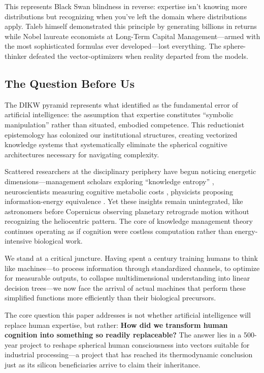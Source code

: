 This represents \citet{taleb2007} Black Swan blindness in reverse: expertise isn't knowing more distributions but recognizing when you've left the domain where distributions apply. Taleb himself demonstrated this principle by generating billions in returns while Nobel laureate economists at Long-Term Capital Management---armed with the most sophisticated formulas ever developed---lost everything. The sphere-thinker defeated the vector-optimizers when reality departed from the models.

\subsection{The Question Before Us}

The DIKW pyramid represents what \citet{dreyfus1979} identified as the fundamental error of artificial intelligence: the assumption that expertise constitutes ``symbolic manipulation'' rather than situated, embodied competence. This reductionist epistemology has colonized our institutional structures, creating vectorized knowledge systems that systematically eliminate the spherical cognitive architectures necessary for navigating complexity.

Scattered researchers at the disciplinary periphery have begun noticing energetic dimensions---management scholars exploring ``knowledge entropy'' \citep{bratianu2020}, neuroscientists measuring cognitive metabolic costs \citep{wiehler2022}, physicists proposing information-energy equivalence \citep{stonier1996}. Yet these insights remain unintegrated, like astronomers before Copernicus observing planetary retrograde motion without recognizing the heliocentric pattern. The core of knowledge management theory continues operating as if cognition were costless computation rather than energy-intensive biological work.

We stand at a critical juncture. Having spent a century training humans to think like machines---to process information through standardized channels, to optimize for measurable outputs, to collapse multidimensional understanding into linear decision trees---we now face the arrival of actual machines that perform these simplified functions more efficiently than their biological precursors.

The core question this paper addresses is not whether artificial intelligence will replace human expertise, but rather: \textbf{How did we transform human cognition into something so readily replaceable?} The answer lies in a 500-year project to reshape spherical human consciousness into vectors suitable for industrial processing---a project that has reached its thermodynamic conclusion just as its silicon beneficiaries arrive to claim their inheritance.


